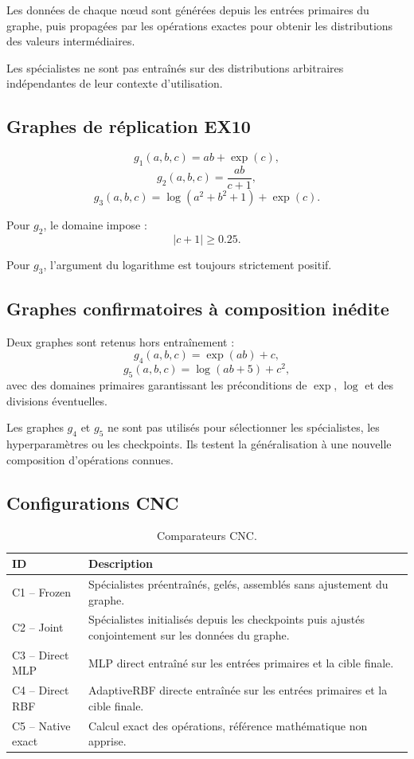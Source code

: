 \documentclass[11pt,a4paper]{article}
\begin{document}
Les données de chaque nœud sont générées depuis les entrées primaires
du graphe, puis propagées par les opérations exactes pour obtenir les
distributions des valeurs intermédiaires.

Les spécialistes ne sont pas entraînés sur des distributions
arbitraires indépendantes de leur contexte d'utilisation.

\subsection{Graphes de réplication EX10}

\[
g_1(a,b,c)=ab+\exp(c),
\]
\[
g_2(a,b,c)=\frac{ab}{c+1},
\]
\[
g_3(a,b,c)=\log(a^2+b^2+1)+\exp(c).
\]

Pour $g_2$, le domaine impose :
\[
|c+1|\geq 0.25.
\]

Pour $g_3$, l'argument du logarithme est toujours strictement positif.

\subsection{Graphes confirmatoires à composition inédite}

Deux graphes sont retenus hors entraînement :
\[
g_4(a,b,c)=\exp(ab)+c,
\]
\[
g_5(a,b,c)=\log(ab+5)+c^2,
\]
avec des domaines primaires garantissant les préconditions de
$\exp$, $\log$ et des divisions éventuelles.

Les graphes $g_4$ et $g_5$ ne sont pas utilisés pour sélectionner
les spécialistes, les hyperparamètres ou les checkpoints.
Ils testent la généralisation à une nouvelle composition d'opérations
connues.

\subsection{Configurations CNC}

\begin{table}[H]
\centering
\small
\begin{tabularx}{\textwidth}{l X}
\toprule
\textbf{ID} & \textbf{Description} \\
\midrule
C1 -- Frozen & Spécialistes préentraînés, gelés, assemblés sans
ajustement du graphe. \\
C2 -- Joint & Spécialistes initialisés depuis les checkpoints puis
ajustés conjointement sur les données du graphe. \\
C3 -- Direct MLP & MLP direct entraîné sur les entrées primaires
et la cible finale. \\
C4 -- Direct RBF & AdaptiveRBF directe entraînée sur les entrées
primaires et la cible finale. \\
C5 -- Native exact & Calcul exact des opérations, référence
mathématique non apprise. \\
\bottomrule
\end{tabularx}
\caption{Comparateurs CNC.}
\end{table}
\end{document}
